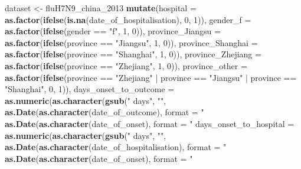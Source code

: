 \documentclass[]{article}
\newenvironment{Shaded}{\begin{snugshade}}{\end{snugshade}}
\newcommand{\KeywordTok}[1]{\textcolor[rgb]{0.13,0.29,0.53}{\textbf{{#1}}}}
\newcommand{\DataTypeTok}[1]{\textcolor[rgb]{0.13,0.29,0.53}{{#1}}}
\newcommand{\DecValTok}[1]{\textcolor[rgb]{0.00,0.00,0.81}{{#1}}}
\newcommand{\StringTok}[1]{\textcolor[rgb]{0.31,0.60,0.02}{{#1}}}
\newcommand{\NormalTok}[1]{{#1}}
\begin{document}
\begin{Shaded}
\begin{Highlighting}[]
\NormalTok{dataset <-}\StringTok{ }\NormalTok{fluH7N9_china_2013 %
\StringTok{  }\KeywordTok{mutate}\NormalTok{(}\DataTypeTok{hospital =} \KeywordTok{as.factor}\NormalTok{(}\KeywordTok{ifelse}\NormalTok{(}\KeywordTok{is.na}\NormalTok{(date_of_hospitalisation), }\DecValTok{0}\NormalTok{, }\DecValTok{1}\NormalTok{)),}
         \DataTypeTok{gender_f =} \KeywordTok{as.factor}\NormalTok{(}\KeywordTok{ifelse}\NormalTok{(gender ==}\StringTok{ "f"}\NormalTok{, }\DecValTok{1}\NormalTok{, }\DecValTok{0}\NormalTok{)),}
         \DataTypeTok{province_Jiangsu =} \KeywordTok{as.factor}\NormalTok{(}\KeywordTok{ifelse}\NormalTok{(province ==}\StringTok{ "Jiangsu"}\NormalTok{, }\DecValTok{1}\NormalTok{, }\DecValTok{0}\NormalTok{)),}
         \DataTypeTok{province_Shanghai =} \KeywordTok{as.factor}\NormalTok{(}\KeywordTok{ifelse}\NormalTok{(province ==}\StringTok{ "Shanghai"}\NormalTok{, }\DecValTok{1}\NormalTok{, }\DecValTok{0}\NormalTok{)),}
         \DataTypeTok{province_Zhejiang =} \KeywordTok{as.factor}\NormalTok{(}\KeywordTok{ifelse}\NormalTok{(province ==}\StringTok{ "Zhejiang"}\NormalTok{, }\DecValTok{1}\NormalTok{, }\DecValTok{0}\NormalTok{)),}
         \DataTypeTok{province_other =} \KeywordTok{as.factor}\NormalTok{(}\KeywordTok{ifelse}\NormalTok{(province ==}\StringTok{ "Zhejiang"} \NormalTok{|}\StringTok{ }\NormalTok{province ==}\StringTok{ "Jiangsu"} \NormalTok{|}\StringTok{ }\NormalTok{province ==}\StringTok{ "Shanghai"}\NormalTok{, }\DecValTok{0}\NormalTok{, }\DecValTok{1}\NormalTok{)),}
         \DataTypeTok{days_onset_to_outcome =} \KeywordTok{as.numeric}\NormalTok{(}\KeywordTok{as.character}\NormalTok{(}\KeywordTok{gsub}\NormalTok{(}\StringTok{" days"}\NormalTok{, }\StringTok{""}\NormalTok{,}
                                      \KeywordTok{as.Date}\NormalTok{(}\KeywordTok{as.character}\NormalTok{(date_of_outcome), }\DataTypeTok{format =} \StringTok{"%
\StringTok{                                        }\KeywordTok{as.Date}\NormalTok{(}\KeywordTok{as.character}\NormalTok{(date_of_onset), }\DataTypeTok{format =} \StringTok{"%
         \DataTypeTok{days_onset_to_hospital =} \KeywordTok{as.numeric}\NormalTok{(}\KeywordTok{as.character}\NormalTok{(}\KeywordTok{gsub}\NormalTok{(}\StringTok{" days"}\NormalTok{, }\StringTok{""}\NormalTok{,}
                                      \KeywordTok{as.Date}\NormalTok{(}\KeywordTok{as.character}\NormalTok{(date_of_hospitalisation), }\DataTypeTok{format =} \StringTok{"%
\StringTok{                                        }\KeywordTok{as.Date}\NormalTok{(}\KeywordTok{as.character}\NormalTok{(date_of_onset), }\DataTypeTok{format =} \StringTok{"%
}}}}}
\end{Highlighting}
\end{Shaded}
\end{document}
